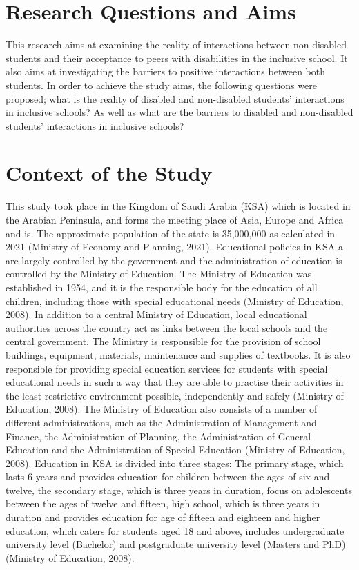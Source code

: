 \documentclass[11pt]{sig-alternate}
\begin{document}
\begin{large}
\section*{Research Questions and Aims}

This research aims at examining the reality of interactions between non-disabled students and their acceptance to peers with disabilities in the inclusive school. It also aims at investigating the barriers to positive interactions between both students. In order to achieve the study aims, the following questions were proposed; what is the reality of disabled and non-disabled students’ interactions in inclusive schools? As well as what are the barriers to disabled and non-disabled students’ interactions in inclusive schools? 

\section*{Context of the Study}
This study took place in the Kingdom of Saudi Arabia (KSA) which is located in the Arabian Peninsula, and forms the meeting place of Asia, Europe and Africa and is. The approximate population of the state is 35,000,000 as calculated in 2021 (Ministry of Economy and Planning, 2021). Educational policies in KSA a are largely controlled by the government and the administration of education is controlled by the Ministry of Education. The Ministry of Education was established in 1954, and it is the responsible body for the education of all children, including those with special educational needs (Ministry of Education, 2008). In addition to a central Ministry of Education, local educational authorities across the country act as links between the local schools and the central government. The Ministry is responsible for the provision of school buildings, equipment, materials, maintenance and supplies of textbooks. It is also responsible for providing special education services for students with special educational needs in such a way that they are able to practise their activities in the least restrictive environment possible, independently and safely (Ministry of Education, 2008). The Ministry of Education also consists of a number of different administrations, such as the Administration of Management and Finance, the Administration of Planning, the Administration of General Education and the Administration of Special Education (Ministry of Education, 2008). Education in KSA is divided into three stages: The primary stage, which lasts 6 years and provides education for children between the ages of six and twelve, the secondary stage, which is three years in duration, focus on adolescents between the ages of twelve and fifteen, high school, which is three years in duration and provides education for age of fifteen and eighteen and higher education, which caters for students aged 18 and above, includes undergraduate university level (Bachelor) and postgraduate university level (Masters and PhD) (Ministry of Education, 2008).


\end{large}
\end{document}
